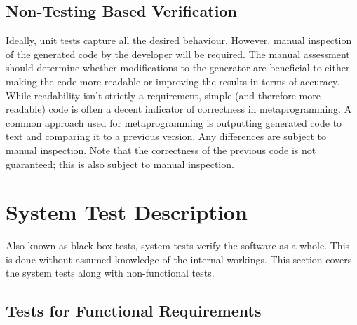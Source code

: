 \documentclass[12pt, titlepage]{article}
\begin{document}
		

\subsection{Non-Testing Based Verification}


Ideally, unit tests capture all the desired behaviour. However, manual 
inspection of the generated code by the developer will be required. The manual 
assessment should 
determine 
whether modifications to the generator are beneficial to either making the code 
more readable or improving the results in terms of accuracy.
While readability isn't strictly a requirement, simple (and therefore more 
readable) code is often a decent indicator of correctness in metaprogramming.
A common approach used for metaprogramming is outputting generated code to text 
and comparing it to a previous version. Any differences are subject to manual 
inspection. Note that the correctness of the previous code is not guaranteed; 
this is also subject to manual inspection.
\section{System Test Description}

Also known as black-box tests, system tests verify the software as a whole. 
This is done without assumed knowledge of the internal workings.
This section covers the system tests along with non-functional tests.

\subsection{Tests for Functional Requirements}
\end{document}
